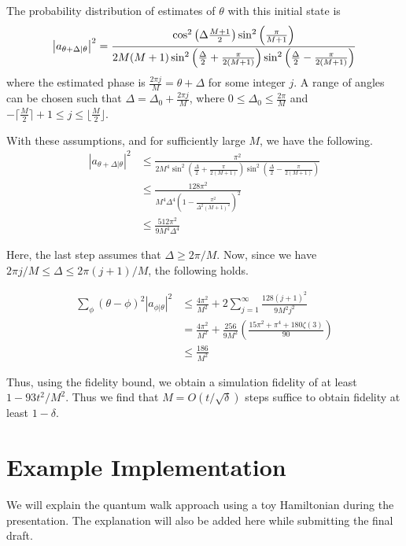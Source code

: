 \documentclass[
10pt, %
a4paper, %
oneside, %
headinclude,footinclude, %
BCOR5mm, %
]{scrartcl}
\begin{document}
The probability distribution of estimates of $\theta$ with this initial state is
$$\abs{a_{\theta+\Delta|\theta}}^2=\frac{\cos^2\left(\Delta\frac{M+1}{2}\right)\sin^2\left(\frac{\pi}{M+1}\right)}{2M(M+1)\sin^2\left(\frac{\Delta}{2}+\frac{\pi}{2(M+1)}\right)\sin^2\left(\frac{\Delta}{2}-\frac{\pi}{2(M+1)}\right)}$$
where the estimated phase is $\frac{2\pi j}{M}=\theta+\Delta$ for some integer $j$. A range of angles can be chosen such that $\Delta=\Delta_0+\frac{2\pi j}{M}$, where $0\leq\Delta_0\leq\frac{2\pi}{M}$ and $-\lceil \frac{M}{2}\rceil+1\leq j\leq\lfloor\frac{M}{2}\rfloor$.\newline 


With these assumptions, and for sufficiently large $M$, we have the following.
\begin{align*}
|a_{\theta + \Delta|\theta}|^2 &\leq \frac{\pi^2}{2M^4\sin^2\left(\frac{\Delta}{2} + \frac{\pi}{2(M + 1)}\right)\sin^2\left(\frac{\Delta}{2} - \frac{\pi}{2(M + 1)}\right)}\\
&\leq \frac{128\pi^2}{M^4\Delta^4\left(1 - \frac{\pi^2}{\Delta^2(M + 1)^2}\right)^2}\\
&\leq \frac{512\pi^2}{9M^4\Delta^4}
\end{align*}

Here, the last step assumes that $\Delta \geq 2\pi/M$. Now, since we have $2\pi j/M \leq \Delta \leq 2\pi(j + 1)/M$, the following holds.

\begin{align*}
\sum_{\phi} (\theta - \phi)^2 |a_{\phi|\theta}|^2 &\leq \frac{4\pi^2}{M^2} + 2 \sum_{j = 1}^{\infty}\frac{128(j + 1)^2}{9M^2j^2}\\
&= \frac{4\pi^2}{M^2} + \frac{256}{9M^2}\left(\frac{15\pi^2 + \pi^4 + 180\zeta(3)}{90}\right)\\
&\leq \frac{186}{M^2}
\end{align*}

Thus, using the fidelity bound, we obtain a simulation fidelity of at least $1 - 93t^2/M^2$. Thus we find that $M = O(t/\sqrt \delta)$ steps suffice to obtain fidelity at least $1-\delta$.

\section{Example Implementation}
We will explain the quantum walk approach using a toy Hamiltonian during the presentation. The explanation will also be added here while submitting the final draft.
\end{document}
